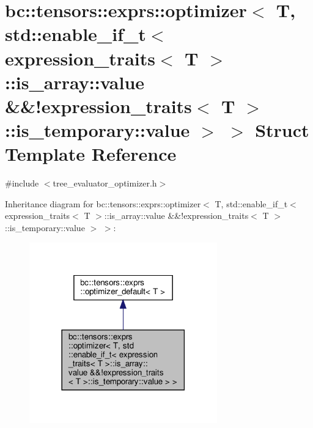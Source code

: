 \hypertarget{structbc_1_1tensors_1_1exprs_1_1optimizer_3_01T_00_01std_1_1enable__if__t_3_01expression__traits827da0847239e19d0d58ed2226e62750}{}\section{bc\+:\+:tensors\+:\+:exprs\+:\+:optimizer$<$ T, std\+:\+:enable\+\_\+if\+\_\+t$<$ expression\+\_\+traits$<$ T $>$\+:\+:is\+\_\+array\+:\+:value \&\&!expression\+\_\+traits$<$ T $>$\+:\+:is\+\_\+temporary\+:\+:value $>$ $>$ Struct Template Reference}
\label{structbc_1_1tensors_1_1exprs_1_1optimizer_3_01T_00_01std_1_1enable__if__t_3_01expression__traits827da0847239e19d0d58ed2226e62750}


{\ttfamily \#include $<$tree\+\_\+evaluator\+\_\+optimizer.\+h$>$}



Inheritance diagram for bc\+:\+:tensors\+:\+:exprs\+:\+:optimizer$<$ T, std\+:\+:enable\+\_\+if\+\_\+t$<$ expression\+\_\+traits$<$ T $>$\+:\+:is\+\_\+array\+:\+:value \&\&!expression\+\_\+traits$<$ T $>$\+:\+:is\+\_\+temporary\+:\+:value $>$ $>$\+:\nopagebreak
\begin{figure}[H]
\begin{center}
\leavevmode
\includegraphics[width=230pt]{structbc_1_1tensors_1_1exprs_1_1optimizer_3_01T_00_01std_1_1enable__if__t_3_01expression__traits8e199d56eb02ca69dec9e855d1f3cbb8}
\end{center}
\end{figure}


